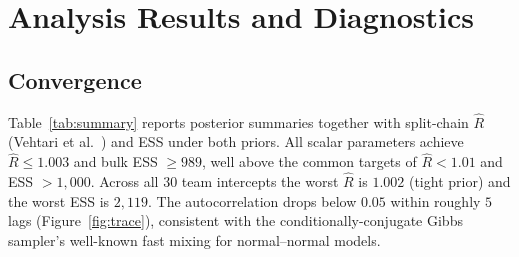 \documentclass[11pt]{article}
\begin{document}
\section{Analysis Results and Diagnostics}\label{sec:diagnostics}

\subsection{Convergence}

Table~\ref{tab:summary} reports posterior summaries together with split-chain
$\hat R$ (Vehtari et al.~\cite{vehtari}) and ESS under both priors. All scalar
parameters achieve $\hat R \le 1.003$ and bulk ESS $\ge 989$, well above the
common targets of $\hat R < 1.01$ and ESS $> 1{,}000$. Across all 30 team
intercepts the worst $\hat R$ is $1.002$ (tight prior) and the worst ESS is
$2{,}119$. The autocorrelation drops below $0.05$ within roughly $5$ lags
(Figure~\ref{fig:trace}), consistent with the conditionally-conjugate Gibbs
sampler's well-known fast mixing for normal–normal models.
\end{document}
